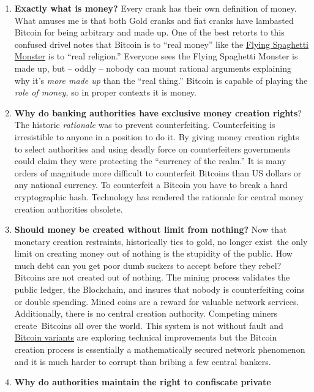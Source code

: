 \begin{enumerate}
\item
  \textbf{Exactly what is money?} Every crank has their own
  definition of money. What amuses me is that both Gold cranks and fiat
  cranks have lambasted Bitcoin for being arbitrary and made up. One of
  the best retorts to this confused drivel notes that Bitcoin is to
  ``real money'' like the \href{http://www.venganza.org/}{Flying
  Spaghetti Monster} is to ``real religion.'' Everyone sees the Flying
  Spaghetti Monster is made up, but -- oddly -- nobody can mount
  rational arguments explaining why it's \emph{more made up} than the
  ``real thing.'' Bitcoin is capable of playing the \emph{role of
  money,} so in proper contexts it is money.
\item
  \textbf{Why do banking authorities have exclusive money creation
  rights}? The historic \emph{rationale} was to prevent counterfeiting.
  Counterfeiting is irresistible to anyone in a position to do it. By
  giving money creation rights to select authorities and using deadly
  force on counterfeiters governments could claim they were protecting
  the ``currency of the realm.'' It is many orders of magnitude more
  difficult to counterfeit Bitcoins than US dollars or any national
  currency. To counterfeit a Bitcoin you have to break a hard
  cryptographic hash. Technology has rendered the rationale for central
  money creation authorities obsolete.
\item
  \textbf{Should money be created without limit from nothing?} Now that
  monetary creation restraints, historically ties to gold, no longer
  exist~the only limit on creating money out of nothing is the stupidity
  of the public. How much debt can you get poor dumb suckers to accept
  before they rebel? Bitcoins are not created out of nothing. The mining
  process validates the public ledger, the Blockchain, and insures that
  nobody is counterfeiting coins or double spending. Mined coins are a
  reward for valuable network services. Additionally, there is no
  central creation authority. Competing miners create~Bitcoins
  all over the world. This system is not without fault and
  \href{http://vertcoin.org/}{Bitcoin variants} are exploring technical
  improvements but the Bitcoin creation process is essentially a
  mathematically secured network phenomenon and it is much harder to
  corrupt than bribing a few central bankers.
\item
  \textbf{Why do authorities maintain the right to confiscate private
}
\end{enumerate}
